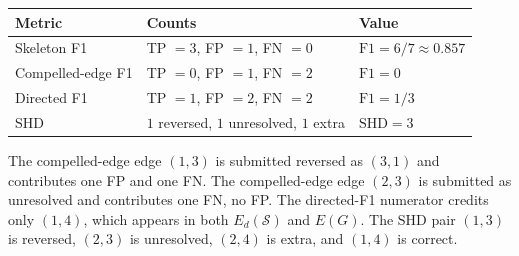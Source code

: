 \begin{center}
\begin{tabular}{lll}
\toprule
Metric              & Counts                              & Value \\
\midrule
Skeleton F1         & TP $= 3$, FP $= 1$, FN $= 0$        & $\mathrm{F1} = 6/7 \approx 0.857$ \\
Compelled-edge F1   & TP $= 0$, FP $= 1$, FN $= 2$        & $\mathrm{F1} = 0$ \\
Directed F1         & TP $= 1$, FP $= 2$, FN $= 2$        & $\mathrm{F1} = 1/3$ \\
SHD                 & $1$ reversed, $1$ unresolved, $1$ extra & $\mathrm{SHD} = 3$ \\
\bottomrule
\end{tabular}
\end{center}

The compelled-edge edge $(1, 3)$ is submitted reversed as $(3, 1)$ and contributes one FP and one FN. The compelled-edge edge $(2, 3)$ is submitted as unresolved and contributes one FN, no FP. The directed-F1 numerator credits only $(1, 4)$, which appears in both $E_d(\mathcal{S})$ and $E(G)$. The SHD pair $(1, 3)$ is reversed, $(2, 3)$ is unresolved, $(2, 4)$ is extra, and $(1, 4)$ is correct.
